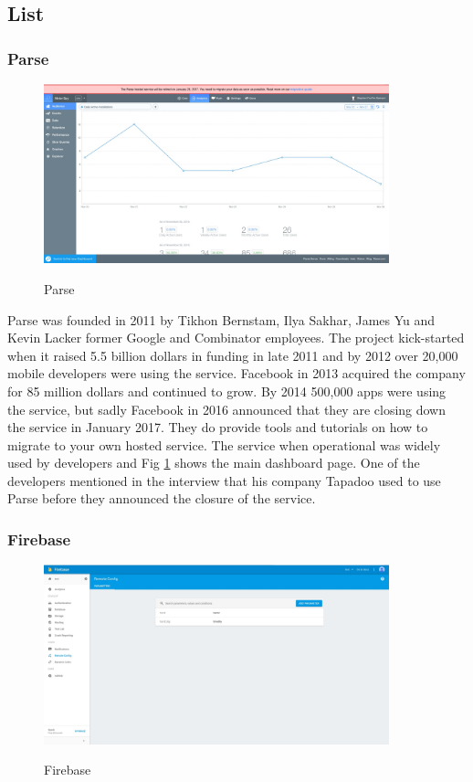 \subsection{List}

\subsubsection{Parse}

\begin{figure}[!h]
    \caption{Parse}
    \centering
    \includegraphics[width=100mm]{images/parse}
    \label{fig:parse}
\end{figure}

Parse \cite{parse} was founded in 2011 by Tikhon Bernstam, Ilya Sakhar, James Yu and Kevin Lacker former Google and Combinator employees. The project kick-started when it raised 5.5 billion dollars in funding in late 2011 and by 2012 over 20,000 mobile developers were using the service. Facebook in 2013 acquired the company for 85 million dollars and continued to grow. By 2014 500,000 apps were using the service, but sadly Facebook in 2016 announced that they are closing down the service in January 2017. They do provide tools and tutorials on how to migrate to your own hosted service. The service when operational was widely used by developers and Fig \ref{fig:parse} shows the main dashboard page. One of the developers mentioned in the interview that his company Tapadoo used to use Parse before they announced the closure of the service.

\subsubsection{Firebase}

\begin{figure}[!h]
    \caption{Firebase}
    \centering
    \includegraphics[width=100mm]{images/firebase}
    \label{fig:firebase}
\end{figure}

